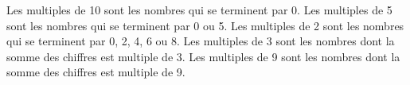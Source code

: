 Les multiples de 10 sont les nombres qui se terminent par 0.\vskip5pt\noindent
Les multiples de 5 sont les nombres qui se terminent par 0 ou 5.\vskip5pt\noindent
Les multiples de 2 sont les nombres qui se terminent par 0, 2, 4, 6 ou 8.\vskip5pt\noindent
Les multiples de 3 sont les nombres dont la somme des chiffres est multiple de 3.\vskip5pt\noindent
Les multiples de 9 sont les nombres dont la somme des chiffres est multiple de 9.\vskip5pt\noindent
